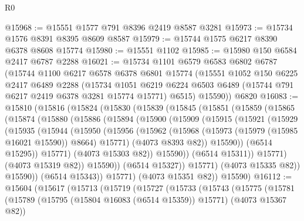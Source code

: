 \begin{lexlean}{R0}
\begin{coremodule}
@15968 := @15551 @1577 @791 @8396 @2419 @8587 @3281
@15973 := @15734 @1576 @8391 @8395 @8609 @8587
@15979 := @15744 @1575 @6217 @8390 @6378 @8608 @15774
@15980 := @15551 @1102
@15985 := @15980 @150 @6584 @2417 @6787 @2288
@16021 := @15734
    @1101
    @6579
    @6583
    @6802
    @6787
    (@15744
      @1100
      @6217
      @6578
      @6378
      @6801
      @15774
      (@15551
        @1052
        @150
        @6225
        @2417
        @6489
        @2288
        (@15734
          @1051
          @6219
          @6224
          @6503
          @6489
          (@15744 @791 @6217 @2419 @6378 @3281 @15774 @15771)
          @6515)
        @15590))
    @6820
@16083 := @15810
    (@15816
      (@15824
        (@15830
          (@15839
            (@15845
              (@15851
                (@15859
                  (@15865
                    (@15874
                      (@15880
                        (@15886
                          (@15894
                            (@15900
                              (@15909
                                (@15915
                                  (@15921
                                    (@15929
                                      (@15935
                                        (@15944
                                          (@15950
                                            (@15956
                                              (@15962
                                                (@15968
                                                  (@15973 (@15979 (@15985 @16021 @15590)) @8664)
                                                  @15771)
                                                (@4073 @8393 @82))
                                              @15590))
                                          (@6514 @15295))
                                        @15771)
                                      (@4073 @15303 @82))
                                    @15590))
                                (@6514 @15311))
                              @15771)
                            (@4073 @15319 @82))
                          @15590))
                      (@6514 @15327))
                    @15771)
                  (@4073 @15335 @82))
                @15590))
            (@6514 @15343))
          @15771)
        (@4073 @15351 @82))
      @15590)
@16112 := @15604
    (@15617
      (@15713
        (@15719
          (@15727
            (@15733
              (@15743
                (@15775
                  (@15781
                    (@15789 (@15795 (@15804 @16083 (@6514 @15359)) @15771) (@4073 @15367 @82))

\end{coremodule}
\end{lexlean}

